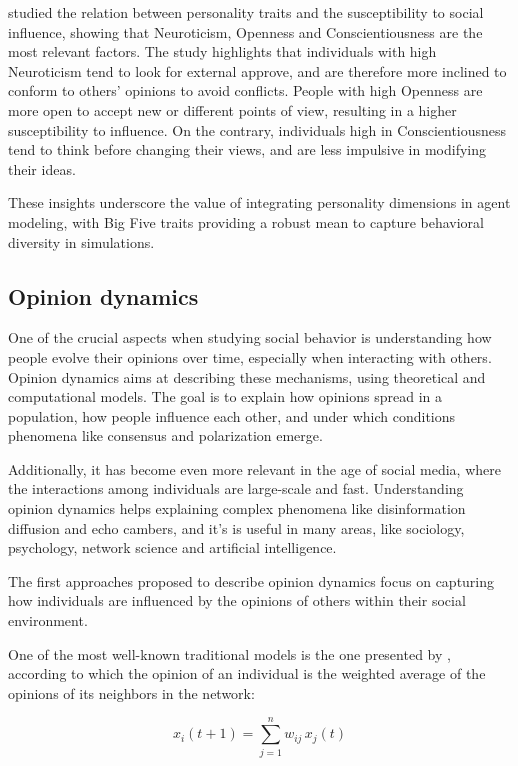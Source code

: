 \medskip
\citet{oyibo2019personality} studied the relation between personality traits and the susceptibility to social influence, showing that Neuroticism, Openness and Conscientiousness are the most relevant factors.
The study highlights that individuals with high Neuroticism tend to look for external approve, and are therefore more inclined to conform to others' opinions to avoid conflicts.
People with high Openness are more open to accept new or different points of view, resulting in a higher susceptibility to influence.
On the contrary, individuals high in Conscientiousness tend to think before changing their views, and are less impulsive in modifying their ideas.

\medskip
These insights underscore the value of integrating personality dimensions in agent modeling, with Big Five traits providing a robust mean to capture behavioral diversity in simulations.




\subsection{Opinion dynamics}
One of the crucial aspects when studying social behavior is understanding how people evolve their opinions over time, especially when interacting with others.
Opinion dynamics aims at describing these mechanisms, using theoretical and computational models.
The goal is to explain how opinions spread in a population, how people influence each other, and under which conditions phenomena like consensus and polarization emerge.

Additionally, it has become even more relevant in the age of social media, where the interactions among individuals are large-scale and fast.
Understanding opinion dynamics helps explaining complex phenomena like disinformation diffusion and echo cambers, and it's is useful in many areas, like sociology, psychology, network science and artificial intelligence.


\medskip
The first approaches proposed to describe opinion dynamics focus on capturing how individuals are influenced by the opinions of others within their social environment.

One of the most well-known traditional models is the one presented by \citet{Degroot1974}, according to which the opinion of an individual is the weighted average of the opinions of its neighbors in the network:

\[
x_i(t+1) = \sum_{j=1}^n w_{ij} \, x_j(t)
\]

